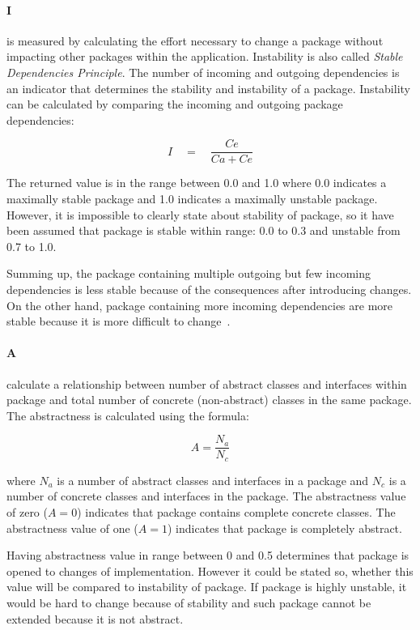 \paragraph{\ac{I}} is measured by calculating the effort necessary  to change a package without impacting other packages within the application. Instability is also called \textit{Stable Dependencies Principle}. The number of incoming and outgoing dependencies is an indicator that determines the stability and instability of a package. Instability can be calculated by comparing the incoming and outgoing package dependencies:

\begin{equation}
I\quad =\quad \frac { Ce }{ Ca+Ce } 
\end{equation}

The returned value is in the range between 0.0 and 1.0 where 0.0 indicates a maximally stable package and 1.0 indicates a maximally unstable package. However, it is impossible to clearly state about stability of package, so it have been assumed that package is stable within range: 0.0 to 0.3 and unstable from 0.7 to 1.0.

Summing up, the package containing multiple outgoing but few incoming dependencies is less stable because of the consequences after introducing changes. On the other hand, package containing more incoming dependencies are more stable because it is more difficult to change~\cite{martin}.


\paragraph{\ac{A}} calculate a relationship between number of  abstract classes and interfaces within package and total number of concrete (non-abstract) classes in the same package. The abstractness is calculated using the formula:

\begin{equation}
A=\frac {N_{a}}{N_{c}} 
\end{equation}

where $N_{a}$ is a number of abstract classes and interfaces in a package and $N_{c}$ is a number of concrete classes and interfaces in the package. The abstractness value of zero ($A=0$) indicates that package contains complete concrete classes. The abstractness value of one ($A=1$) indicates that package is completely abstract. 

Having abstractness value in range between 0 and 0.5 determines that package is opened to changes of implementation. However it could be stated so, whether this value will be compared to instability of package. If package is highly unstable, it would be hard to change because of stability and such package cannot be extended because it is not abstract.

